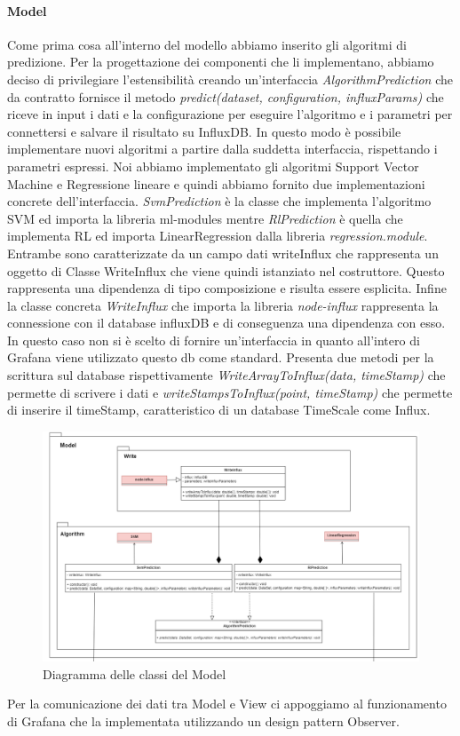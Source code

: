 			\paragraph{Model}
			Come prima cosa all'interno del modello abbiamo inserito gli algoritmi di predizione. Per la progettazione dei componenti che li implementano, abbiamo deciso di privilegiare l'estensibilità creando un'interfaccia \textit{AlgorithmPrediction} che da contratto fornisce il metodo \textit{predict(dataset, configuration, influxParams)} che riceve in input i dati e la configurazione per eseguire l'algoritmo e i parametri per connettersi e salvare il risultato su InfluxDB.
			In questo modo è possibile implementare nuovi algoritmi a partire dalla suddetta interfaccia, rispettando i parametri espressi. Noi abbiamo implementato gli algoritmi Support Vector Machine e Regressione lineare e quindi abbiamo fornito due implementazioni concrete dell'interfaccia.
			\textit{SvmPrediction} è la classe che implementa l'algoritmo SVM ed importa la libreria ml-modules mentre \textit{RlPrediction} è quella che implementa RL ed importa LinearRegression dalla libreria \textit{regression.module}. Entrambe sono caratterizzate da un campo dati writeInflux che rappresenta un oggetto di Classe WriteInflux che viene quindi istanziato nel costruttore. Questo rappresenta una dipendenza di tipo composizione e risulta essere esplicita. 
			Infine la classe concreta \textit{WriteInflux} che importa la libreria \textit{node-influx} rappresenta la connessione con il database influxDB e di conseguenza una dipendenza con esso. In questo caso non si è scelto di fornire un'interfaccia in quanto all'intero di Grafana viene utilizzato questo db come standard. Presenta due metodi per la scrittura sul database rispettivamente \textit{WriteArrayToInflux(data, timeStamp)} che permette di scrivere i dati e \textit{writeStampsToInflux(point, timeStamp)} che permette di inserire il timeStamp, caratteristico di un database TimeScale come Influx. 
			\mbox{}
			\begin{figure} [H]
				\includegraphics[width=\linewidth]{./img/Diagrammi/d1.png}
				\caption{Diagramma delle classi del Model}
			\end{figure}
			Per la comunicazione dei dati tra Model e View ci appoggiamo al funzionamento di Grafana che la implementata utilizzando un design pattern Observer. 
